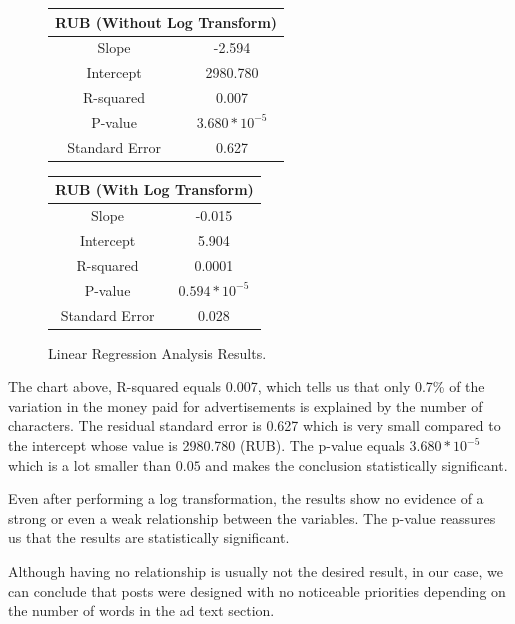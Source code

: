 \documentclass[11pt]{article}
\begin{document}
\bigskip

\begin{figure}[H]
  \centering
  \begin{tabular}{*{2}{c}}
    \toprule
    \multicolumn{2}{c}{RUB (Without Log Transform)}\\
    \midrule
    Slope          & -2.594\\
    \midrule
    Intercept      & 2980.780\\
    \midrule
    R-squared      & 0.007\\
    \midrule
    P-value        & $3.680 * 10^{-5}$\\
    \midrule
    Standard Error & 0.627\\
    \bottomrule
  \end{tabular}
  \quad
  \begin{tabular}{*{2}{c}}
    \toprule
    \multicolumn{2}{c}{RUB (With Log Transform)}\\
    \midrule
    Slope          & -0.015\\
    \midrule
    Intercept      & 5.904\\
    \midrule
    R-squared      & 0.0001\\
    \midrule
    P-value        & $0.594 * 10^{-5}$\\
    \midrule
    Standard Error & 0.028\\
    \bottomrule
  \end{tabular}
  \caption{Linear Regression Analysis Results.}
\end{figure}

The chart above, R-squared equals 0.007, which tells us that only 0.7\%
of the variation in the money paid for advertisements is explained by the
number of characters. The residual standard error is 0.627 which is very small
compared to the intercept whose value is 2980.780 (RUB). The p-value equals
$3.680 * 10^{-5}$ which is a lot smaller than $0.05$ and makes the conclusion
statistically significant.

\bigskip

Even after performing a log transformation, the results show no evidence of a
strong or even a weak relationship between the variables. The p-value reassures
us that the results are statistically significant.

\bigskip

Although having no relationship is usually not the desired result, in our case,
we can conclude that posts were designed with no noticeable priorities
depending on the number of words in the ad text section.
\end{document}
